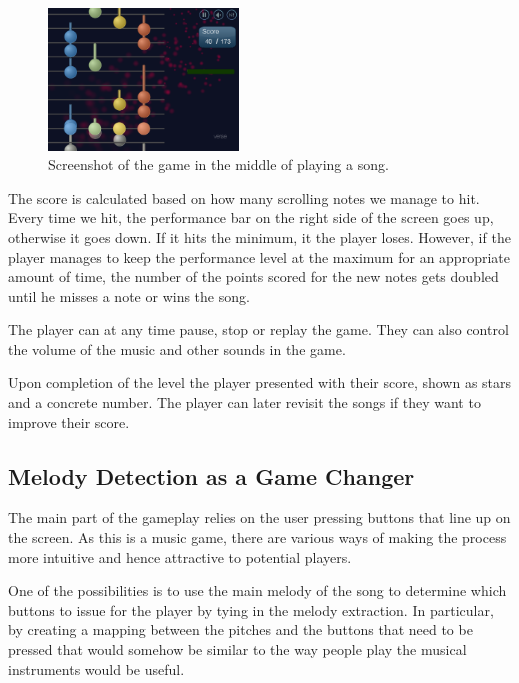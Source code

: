 \begin{figure}
  \begin{center}
    \includegraphics[width=0.45\textwidth]{Figures/FullGame}
  \end{center}
  \caption{Screenshot of the game in the middle of playing a song.}
\label{fig:overallgamescreen}
\end{figure}

The score is calculated based on how many scrolling notes we manage to hit. Every time we hit, the performance bar on the right side of the screen goes up, otherwise it goes down. If it hits the minimum, it the player loses. However, if the player manages to keep the performance level at the maximum for an appropriate amount of time, the number of the points scored for the new notes gets doubled until he misses a note or wins the song.

The player can at any time pause, stop or replay the game. They can also control the volume of the music and other sounds in the game. 

Upon completion of the level the player presented with their score, shown as stars and a concrete number. The player can later revisit the songs if they want to improve their score. 

\vspace{10pt}

\subsection{Melody Detection as a Game Changer}

The main part of the gameplay relies on the user pressing buttons that line up on the screen. As this is a music game, there are various ways of making the process more intuitive and hence attractive to potential players. 

One of the possibilities is to use the main melody of the song to determine which buttons to issue for the player by tying in the melody extraction. In particular, by creating a mapping between the pitches and the buttons that need to be pressed that would somehow be similar to the way people play the musical instruments would be useful.

